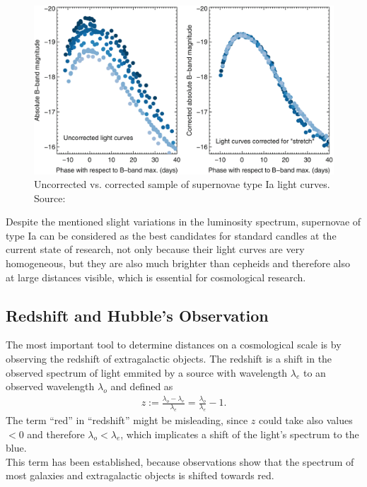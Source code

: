 \begin{figure}[H]
    \centering
    \includegraphics[scale=0.35]{figures/images/supernovae-stretch.png}
    \caption{Uncorrected vs. corrected sample of supernovae type Ia light curves. \\ 
    Source: \cite[p. 298, Figure 2]{Maguire2017}} 
\end{figure}

\noindent Despite the mentioned slight variations in the luminosity spectrum, supernovae of type Ia can be considered as the best candidates for standard candles at the current state of research, not only because their light curves are very homogeneous, but they are also much brighter than cepheids and therefore also at large distances visible, which is essential for cosmological research.


\subsection{Redshift and Hubble's Observation}

The most important tool to determine distances on a cosmological scale is by observing the redshift of extragalactic objects. The redshift is a shift in the observed spectrum of light emmited by a source with wavelength $\lambda_{e}$ to an observed wavelength $\lambda_{o}$ and defined as
\begin{align}
    z := \frac{\lambda_{o} - \lambda_{e}}{\lambda_{e}} = \frac{\lambda_{o}}{\lambda_{e}} - 1. \label{eq:redshift}
\end{align}
The term ``red'' in ``redshift'' might be misleading, since $z$ could take also values $<0$ and therefore $\lambda_{o} < \lambda_{e}$, which implicates a shift of the light's spectrum to the blue. \\
This term has been established, because observations show that the spectrum of most galaxies and extragalactic objects is shifted towards red. \\

